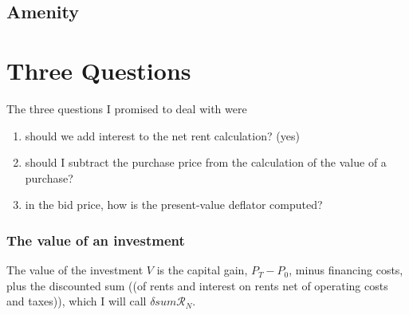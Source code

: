 
\section{Amenity}

\chapter{Three Questions}

The three questions I promised to deal with were
\begin{enumerate}
    \item should we add interest to the net rent calculation? (yes)
    \item should I subtract the purchase price from the calculation of the value of a purchase?
    \item in the bid price, how is the present-value deflator computed?
\end{enumerate}

\subsection{The value of an investment}
The value of the investment $V$ is  the capital gain, $P_{T}-P_{0}$, minus financing costs, plus the discounted sum ((of rents and interest on rents net of operating costs and taxes)), which I will call $\delta sum\mathcal{R}_N$.  

